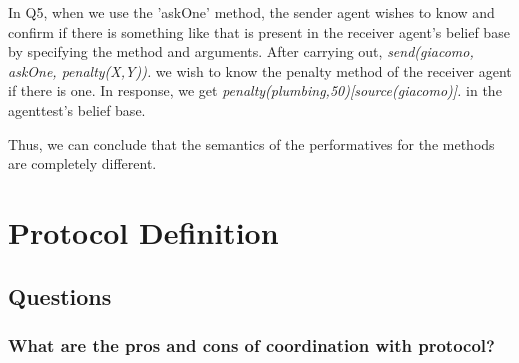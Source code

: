 \documentclass[]{article}
\begin{document}
In Q5, when we use the 'askOne' method, the sender agent wishes to know and confirm if there is something like that is present
in the receiver agent's belief base by specifying the method and arguments. After carrying out, \emph{send(giacomo, askOne, penalty(X,Y)).} we 
wish to know the penalty method of the receiver agent if there is one. In response, we get \emph{penalty(plumbing,50)[source(giacomo)].}
in the agenttest's belief base.

Thus, we can conclude that the semantics of the performatives for the methods are completely different.
\section{Protocol Definition}

\subsection{Questions}
\subsubsection{What are the pros and cons of coordination with protocol?}
\end{document}
